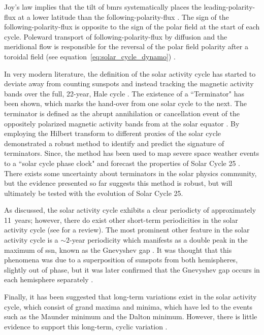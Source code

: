Joy's law implies that the tilt of \glspl{bmr} systematically places the leading-polarity-flux at a lower latitude than the following-polarity-flux \citep{hathaway_solar_2015}. The sign of the following-polarity-flux is opposite to the sign of the polar field at the start of each cycle. Poleward transport of following-polarity-flux by diffusion and the meridional flow is responsible for the reversal of the polar field polarity after a toroidal field (see equation~\ref{eq:solar_cycle_dynamo}) \citep{sheeley_surface_2005, charbonneau_dynamo_2020}.

In very modern literature, the definition of the solar activity cycle has started to deviate away from counting sunspots and instead tracking the magnetic activity bands over the full, 22-year, Hale cycle \citep{leamon_termination_2018, leamon_timing_2020}. The existence of a ``Terminator" has been shown, which marks the hand-over from one solar cycle to the next. The terminator is defined as the abrupt annihilation or cancellation event of the oppositely polarized magnetic activity bands from at the solar equator \citep{mcintosh_what_2019}. By employing the Hilbert transform to different proxies of the solar cycle \citet{leamon_timing_2020} demonstrated a robust method to identify and predict the signature of terminators. Since, the method has been used to map severe space weather events to a ``solar cycle phase clock" \citep{chapman_quantifying_2020} and forecast the properties of Solar Cycle 25 \citep{mcintosh_overlapping_2020}. There exists some uncertainty about terminators in the solar physics community, but the evidence presented so far suggests this method is robust, but will ultimately be tested with the evolution of Solar Cycle 25.


As discussed, the solar activity cycle exhibits a clear periodicty of approximately 11~years; however, there do exist other short-term periodicities in the solar activity cycle (see \citet{hathaway_solar_2015} for a review). The most prominent other feature in the solar activity cycle is a $\sim2$-year periodicity which manifests as a double peak in the maximum of \gls{ssn}, known as the Gnevyshev gap \citep{gnevyshev_corona_1963, gnevyshev_11-years_1967}. It was thought that this phenomena was due to a superposition of sunspots from both hemispheres, slightly out of phase, but it was later confirmed that the Gnevyshev gap occurs in each hemisphere separately \citep{norton_solar-cycle_2009}.

Finally, it has been suggested that long-term variations exist in the solar activity cycle, which consist of grand maxima and minima, which have led to the events such as the Maunder minimum and the Dalton minimum. However, there is little evidence to support this long-term, cyclic variation \citep{hathaway_solar_2015}.

